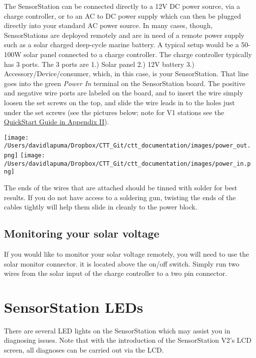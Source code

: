 \documentclass[
]{article}
\begin{document}
The SensorStation can be connected directly to a 12V DC power source,
via a charge controller, or to an AC to DC power supply which can then
be plugged directly into your standard AC power source. In many cases,
though, SensorStations are deployed remotely and are in need of a remote
power supply such as a solar charged deep-cycle marine battery. A
typical setup would be a 50-100W solar panel connected to a charge
controller. The charge controller typically has 3 ports. The 3 ports are
1.) Solar panel 2.) 12V battery 3.) Accessory/Device/consumer, which, in
this case, is your SensorStation. That line goes into the green
\emph{Power In} terminal on the SensorStation board. The positive and
negative wire ports are labeled on the board, and to insert the wire
simply loosen the set screws on the top, and slide the wire leads in to
the holes just under the set screws (see the pictures below; note for V1
stations see the \protect\hyperlink{V1Quickstart}{QuickStart Guide in
Appendix II}).

\texttt{[image: /Users/davidlapuma/Dropbox/CTT\_Git/ctt\_documentation/images/power\_out.png]}
\texttt{[image: /Users/davidlapuma/Dropbox/CTT\_Git/ctt\_documentation/images/power\_in.png]}

The ends of the wires that are attached should be tinned with solder for
best results. If you do not have access to a soldering gun, twisting the
ends of the cables tightly will help them slide in cleanly to the power
block.

\hypertarget{monitoring-your-solar-voltage}{%
\subsection{Monitoring your solar
voltage}\label{monitoring-your-solar-voltage}}

If you would like to monitor your solar voltage remotely, you will need
to use the solar monitor connector. it is located above the on/off
switch. Simply run two wires from the solar input of the charge
controller to a two pin connector.

\hypertarget{sensorstation-leds}{%
\section{SensorStation LEDs}\label{sensorstation-leds}}

There are several LED lights on the SensorStation which may assist you
in diagnosing issues. Note that with the introduction of the
SensorStation V2's LCD screen, all diagnoses can be carried out via the
LCD.
\end{document}
